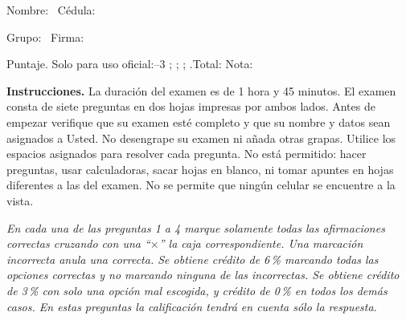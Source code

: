 \documentclass[11pt]{article}
\begin{document}
\examheader

\vspace{4pt}
\noindent Nombre: \dotfill\ Cédula: \dotfill

\vspace{4pt}
\noindent Grupo: \dotfill\ Firma: \dotfill

\vspace{4pt}
\noindent Puntaje. Solo para uso oficial:--3 \dotfill; \dotfill; \dotfill; \dotfill.\quad Total: \dotfill\quad Nota: \dotfill

\vspace{6pt}
\noindent\textbf{Instrucciones.} La duración del examen es de 1 hora y 45 minutos. El examen consta de siete preguntas en dos hojas impresas por ambos lados. Antes de empezar verifique que su examen esté completo y que su nombre y datos sean asignados a Usted. No desengrape su examen ni añada otras grapas. Utilice los espacios asignados para resolver cada pregunta. No está permitido: hacer preguntas, usar calculadoras, sacar hojas en blanco, ni tomar apuntes en hojas diferentes a las del examen. No se permite que ningún celular se encuentre a la vista.

\vspace{8pt}
\noindent\textit{En cada una de las preguntas 1 a 4 marque solamente todas las afirmaciones correctas cruzando con una ``$\times$'' la caja correspondiente. Una marcación incorrecta anula una correcta. Se obtiene crédito de 6\,\% marcando todas las opciones correctas y no marcando ninguna de las incorrectas. Se obtiene crédito de 3\,\% con solo una opción mal escogida, y crédito de 0\,\% en todos los demás casos. En estas preguntas la calificación tendrá en cuenta sólo la respuesta.}
\end{document}
